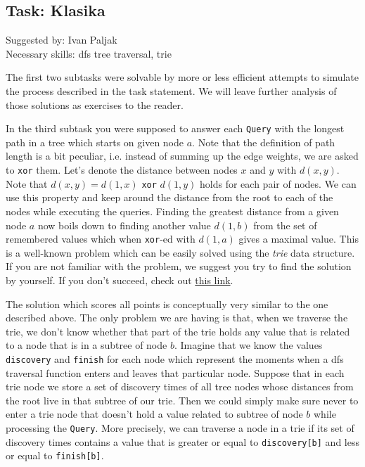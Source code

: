 \documentclass[a4paper]{article}
\begin{document}
\subsection*{Task: Klasika}
\textsf{Suggested by: Ivan Paljak}\\
\textsf{Necessary skills: dfs tree traversal, trie}

The first two subtasks were solvable by more or less efficient attempts
to simulate the process described in the task statement. We will leave
further analysis of those solutions as exercises to the reader.

In the third subtask you were supposed to answer each \texttt{Query} with
the longest path in a tree which starts on given node $a$. Note that the
definition of path length is a bit peculiar, i.e. instead of summing up
the edge weights, we are asked to \texttt{xor} them. Let's denote the distance
between nodes $x$ and $y$ with $d(x,y)$. Note that $d(x, y) = d(1, x)$ \texttt{xor}
$d(1, y)$ holds for each pair of nodes. We can use this property and keep around
the distance from the root to each of the nodes while executing the queries.
Finding the greatest distance from a given node $a$ now boils down to finding
another value $d(1, b)$ from the set of remembered values which when \texttt{xor}-ed
with $d(1, a)$ gives a maximal value. This is a well-known problem which can be
easily solved using the \textit{trie} data structure. If you are not familiar with
the problem, we suggest you try to find the solution by yourself. If you don't
succeed, check out
 \href{https://www.hackerearth.com/practice/notes/lalitkundu95/tutorial-on-trie-and-example-problems/}{this link}.

The solution which scores all points is conceptually very similar to the
one described above. The only problem we are having is that, when we traverse
the trie, we don't know whether that part of the trie holds any value that
is related to a node that is in a subtree of node $b$. Imagine that we know
the values \texttt{discovery} and \texttt{finish} for each node which represent
the moments when a dfs traversal function enters and leaves that particular node.
Suppose that in each trie node we store a set of discovery times of all tree
nodes whose distances from the root live in that subtree of our trie. Then we
could simply make sure never to enter a trie node that doesn't hold a value
related to subtree of node $b$ while processing the \texttt{Query}. More
precisely, we can traverse a node in a trie if its set of discovery times
contains a value that is greater or equal to \texttt{discovery[b]} and
less or equal to \texttt{finish[b]}.
\end{document}
